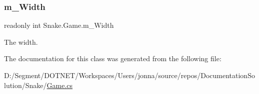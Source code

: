 \subsubsection{\texorpdfstring{m\+\_\+\+Width}{m\_Width}}
{\footnotesize\ttfamily readonly int Snake.\+Game.\+m\+\_\+\+Width\hspace{0.3cm}{\ttfamily [private]}}



The width. 



The documentation for this class was generated from the following file\+:\begin{DoxyCompactItemize}
\item 
D\+:/\+Segment/\+D\+O\+T\+N\+E\+T/\+Workspaces/\+Users/jonna/source/repos/\+Documentation\+Solution/\+Snake/\mbox{\hyperlink{_game_8cs}{Game.\+cs}}\end{DoxyCompactItemize}
